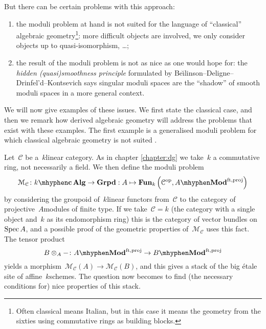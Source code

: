 \begin{refsection}
But there can be certain problems with this approach:
\begin{enumerate}
  \item the moduli problem at hand is not suited for the language of ``classical'' algebraic geometry\footnote{Often classical means Italian, but in this case it means the geometry from the sixties using commutative rings as building blocks.}: more difficult objects are involved, we only consider objects up to quasi-isomorphism, \dots;
  \item the result of the moduli problem is not as nice as one would hope for: the \emph{hidden (quasi)smoothness principle} formulated by Be\u\i linson--Deligne--Drinfel'd--Kontsevich says singular moduli spaces are the ``shadow'' of smooth moduli spaces in a more general context.
\end{enumerate}
We will now give examples of these issues. We first state the classical case, and then we remark how derived algebraic geometry will address the problems that exist with these examples. The first example is a generalised moduli problem for which classical algebraic geometry is not suited \cite[section 1]{toen-vaquie}.
\begin{example}
  Let~$\mathcal{C}$ be a~$k$\dash linear category. As in chapter \ref{chapter:dg} we take~$k$ a commutative ring, not necessarily a field. We then define the moduli problem
  \begin{equation}
    \mathcal{M}_{\mathcal{C}}\colon k\mhyphen\mathbf{c\,Alg}\to\mathbf{Grpd}:A\mapsto\Fun_k\left( \mathcal{C}^\opp,A\mhyphen\Mod^{\mathrm{ft,proj}} \right)
  \end{equation}
  by considering the groupoid of~$k$\dash linear functors from~$\mathcal{C}$ to the category of projective~$A$\dash modules of finite type. If we take~$\mathcal{C}=k$ (the category with a single object and~$k$ as its endomorphism ring) this is the category of vector bundles on~$\operatorname{Spec} A$, and a possible proof of the geometric properties of~$\mathcal{M}_{\mathcal{C}}$ uses this fact. The tensor product
  \begin{equation}
    B\otimes_A-\colon A\mhyphen\Mod^{\mathrm{ft,proj}}\to B\mhyphen\Mod^{\mathrm{ft,proj}}
  \end{equation}
  yields a morphism~$\mathcal{M}_{\mathcal{C}}(A)\to\mathcal{M}_{\mathcal{C}}(B)$, and this gives a stack of the big \'etale site of affine~$k$\dash schemes. The question now becomes to find (the necessary conditions for) nice properties of this stack.


\end{example}
\end{refsection}
